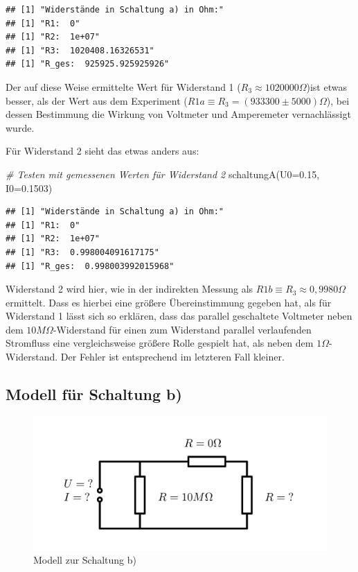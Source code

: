 \documentclass[class=article, crop=false]{standalone}
\newenvironment{Shaded}{\begin{snugshade}}{\end{snugshade}}
\newcommand{\AttributeTok}[1]{\textcolor[rgb]{0.77,0.63,0.00}{#1}}
\newcommand{\CommentTok}[1]{\textcolor[rgb]{0.56,0.35,0.01}{\textit{#1}}}
\newcommand{\FloatTok}[1]{\textcolor[rgb]{0.00,0.00,0.81}{#1}}
\newcommand{\FunctionTok}[1]{\textcolor[rgb]{0.00,0.00,0.00}{#1}}
\newcommand{\NormalTok}[1]{#1}
\begin{document}
\begin{verbatim}
## [1] "Widerstände in Schaltung a) in Ohm:"
## [1] "R1:  0"
## [1] "R2:  1e+07"
## [1] "R3:  1020408.16326531"
## [1] "R_ges:  925925.925925926"
\end{verbatim}

Der auf diese Weise ermittelte Wert für Widerstand 1
(\(R_3\approx 1020000\Omega\))ist etwas besser, als der Wert aus dem
Experiment (\(R1a \equiv R_3 = (933300 \pm 5000)\Omega\)), bei dessen
Bestimmung die Wirkung von Voltmeter und Amperemeter vernachlässigt
wurde.

Für Widerstand 2 sieht das etwas anders aus:

\begin{Shaded}
\begin{Highlighting}[]
\CommentTok{\# Testen mit gemessenen Werten für Widerstand 2}
\FunctionTok{schaltungA}\NormalTok{(}\AttributeTok{U0=}\FloatTok{0.15}\NormalTok{, }\AttributeTok{I0=}\FloatTok{0.1503}\NormalTok{)}
\end{Highlighting}
\end{Shaded}

\begin{verbatim}
## [1] "Widerstände in Schaltung a) in Ohm:"
## [1] "R1:  0"
## [1] "R2:  1e+07"
## [1] "R3:  0.998004091617175"
## [1] "R_ges:  0.998003992015968"
\end{verbatim}

Widerstand 2 wird hier, wie in der indirekten Messung als
\(R1b\equiv R_3 \approx 0,9980\Omega\) ermittelt. Dass es hierbei eine
größere Übereinstimmung gegeben hat, als für Widerstand 1 lässt sich so
erklären, dass das parallel geschaltete Voltmeter neben dem
\(10M\Omega\)-Widerstand für einen zum Widerstand parallel verlaufenden
Stromfluss eine vergleichsweise größere Rolle gespielt hat, als neben
dem \(1\Omega\)-Widerstand. Der Fehler ist entsprechend im letzteren
Fall kleiner.

\hypertarget{modell-fuxfcr-schaltung-b}{%
\subsection{Modell für Schaltung b)}\label{modell-fuxfcr-schaltung-b}}

\begin{figure}
\centering
\includegraphics[width=\textwidth,height=0.2\textheight]{Bilder/ModellB.png}
\caption{Modell zur Schaltung b)}
\end{figure}
\end{document}
